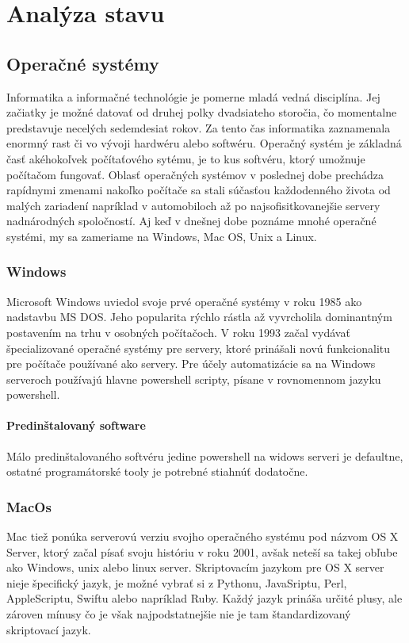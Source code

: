 \section{Analýza stavu}
\subsection{Operačné systémy}
\indent Informatika a informačné technológie je pomerne mladá vedná disciplína. Jej začiatky je možné datovať od druhej polky dvadsiateho storočia, čo momentalne predstavuje necelých sedemdesiat rokov. Za tento čas informatika zaznamenala enormný rast či vo vývoji hardwéru alebo softwéru.  Operačný systém je základná časť akéhokoľvek počítaťového sytému, je to kus softvéru, ktorý umožnuje počítačom fungovať. Oblasť operačných systémov v poslednej dobe prechádza rapídnymi zmenami nakoľko počítače sa stali súčasťou každodenného života od malých zariadení napríklad v automobiloch až po najsofisitkovanejšie servery nadnárodných spoločností. Aj keď v dnešnej dobe poznáme mnohé operačné systémi, my sa zameriame na Windows, Mac OS, Unix a Linux.\cite{osbook}
\subsubsection{Windows}
\indent Microsoft Windows uviedol svoje prvé operačné systémy v roku 1985 ako nadstavbu MS DOS. Jeho popularita rýchlo rástla až vyvrcholila dominantným postavením na trhu v osobných počítačoch. V roku 1993 začal vydávať špecializované operačné systémy pre servery, ktoré prinášali novú funkcionalitu pre počítače používané ako servery. Pre účely automatizácie sa na Windows serveroch používajú hlavne powershell scripty, písane v rovnomennom jazyku powershell.
\paragraph{Predinštalovaný software}
\indent Málo predinštalovaného softvéru jedine powershell na widows serveri je defaultne, ostatné programátorské tooly je potrebné stiahnúť dodatočne. 
\newline
\subsubsection{MacOs}
\indent  Mac tiež ponúka serverovú verziu svojho operačného systému pod názvom OS X Server, ktorý začal písať svoju históriu v roku 2001, avšak neteší sa takej obľube ako Windows, unix alebo linux server. Skriptovacím jazykom pre OS X server nieje špecifický jazyk, je možné vybrať si z Pythonu, JavaSriptu, Perl, AppleScriptu, Swiftu alebo napríklad Ruby. Každý jazyk prináša určité plusy, ale zároven mínusy čo je však najpodstatnejšie nie je tam štandardizovaný skriptovací jazyk.
